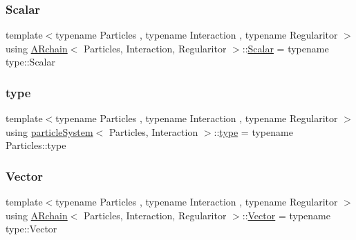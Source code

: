 \mbox{\label{class_a_rchain_a048c8855064f452c7d6d061531a084ed}} 
\subsubsection{\texorpdfstring{Scalar}{Scalar}}
{\footnotesize\ttfamily template$<$typename Particles , typename Interaction , typename Regularitor $>$ \\
using \mbox{\hyperlink{class_a_rchain}{A\+Rchain}}$<$ Particles, Interaction, Regularitor $>$\+::\mbox{\hyperlink{class_a_rchain_a048c8855064f452c7d6d061531a084ed}{Scalar}} =  typename type\+::\+Scalar}

\mbox{\label{class_a_rchain_a7919ed2c8b419f26da20a3bd43ba5fcd}} 
\subsubsection{\texorpdfstring{type}{type}}
{\footnotesize\ttfamily template$<$typename Particles , typename Interaction , typename Regularitor $>$ \\
using \mbox{\hyperlink{classparticle_system}{particle\+System}}$<$ Particles, Interaction $>$\+::\mbox{\hyperlink{classparticle_system_a7919ed2c8b419f26da20a3bd43ba5fcd}{type}} =  typename Particles\+::type}

\mbox{\label{class_a_rchain_a985f967708536cea258613bcc1147c78}} 
\subsubsection{\texorpdfstring{Vector}{Vector}}
{\footnotesize\ttfamily template$<$typename Particles , typename Interaction , typename Regularitor $>$ \\
using \mbox{\hyperlink{class_a_rchain}{A\+Rchain}}$<$ Particles, Interaction, Regularitor $>$\+::\mbox{\hyperlink{class_a_rchain_a985f967708536cea258613bcc1147c78}{Vector}} =  typename type\+::\+Vector}

\mbox{\label{class_a_rchain_a94de7c4b88207f08c7b517736385d9f2}} 
